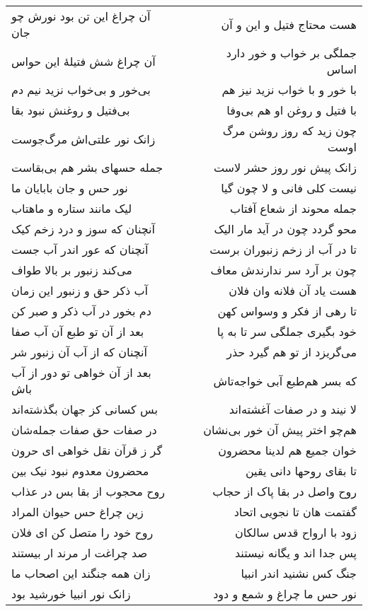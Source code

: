 \begin{center}
\begin{longtable}{l p{0.5cm} r}
\\
آن چراغ این تن بود نورش چو جان
&&
هست محتاج فتیل و این و آن
\\
آن چراغ شش فتیلهٔ این حواس
&&
جملگی بر خواب و خور دارد اساس
\\
بی‌خور و بی‌خواب نزید نیم دم
&&
با خور و با خواب نزید نیز هم
\\
بی‌فتیل و روغنش نبود بقا
&&
با فتیل و روغن او هم بی‌وفا
\\
زانک نور علتی‌اش مرگ‌جوست
&&
چون زید که روز روشن مرگ اوست
\\
جمله حسهای بشر هم بی‌بقاست
&&
زانک پیش نور روز حشر لاست
\\
نور حس و جان بابایان ما
&&
نیست کلی فانی و لا چون گیا
\\
لیک مانند ستاره و ماهتاب
&&
جمله محوند از شعاع آفتاب
\\
آنچنان که سوز و درد زخم کیک
&&
محو گردد چون در آید مار الیک
\\
آنچنان که عور اندر آب جست
&&
تا در آب از زخم زنبوران برست
\\
می‌کند زنبور بر بالا طواف
&&
چون بر آرد سر ندارندش معاف
\\
آب ذکر حق و زنبور این زمان
&&
هست یاد آن فلانه وان فلان
\\
دم بخور در آب ذکر و صبر کن
&&
تا رهی از فکر و وسواس کهن
\\
بعد از آن تو طبع آن آب صفا
&&
خود بگیری جملگی سر تا به پا
\\
آنچنان که از آب آن زنبور شر
&&
می‌گریزد از تو هم گیرد حذر
\\
بعد از آن خواهی تو دور از آب باش
&&
که بسر هم‌طبع آبی خواجه‌تاش
\\
بس کسانی کز جهان بگذشته‌اند
&&
لا نیند و در صفات آغشته‌اند
\\
در صفات حق صفات جمله‌شان
&&
هم‌چو اختر پیش آن خور بی‌نشان
\\
گر ز قرآن نقل خواهی ای حرون
&&
خوان جمیع هم لدینا محضرون
\\
محضرون معدوم نبود نیک بین
&&
تا بقای روحها دانی یقین
\\
روح محجوب از بقا بس در عذاب
&&
روح واصل در بقا پاک از حجاب
\\
زین چراغ حس حیوان المراد
&&
گفتمت هان تا نجویی اتحاد
\\
روح خود را متصل کن ای فلان
&&
زود با ارواح قدس سالکان
\\
صد چراغت ار مرند ار بیستند
&&
پس جدا اند و یگانه نیستند
\\
زان همه جنگند این اصحاب ما
&&
جنگ کس نشنید اندر انبیا
\\
زانک نور انبیا خورشید بود
&&
نور حس ما چراغ و شمع و دود

\end{longtable}
\end{center}
